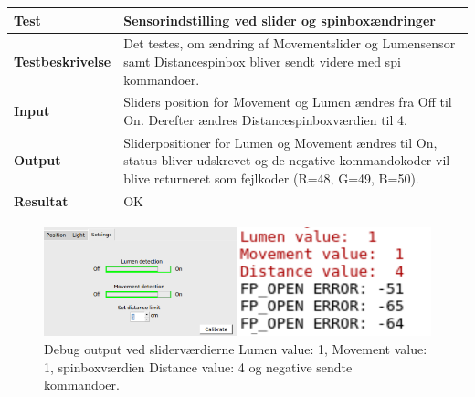 \begin{table}[H]
\begin{tabular}{|l|l|}\hline
\textbf{Test} & Sensorindstilling ved slider og spinboxændringer \\\hline

\textbf{Testbeskrivelse} & \multicolumn{1}{|m{11.5cm}|}{Det testes, om ændring af Movementslider og Lumensensor samt Distancespinbox bliver sendt videre med spi kommandoer.} \\\hline

\textbf{Input} & \multicolumn{1}{|m{11.5cm}|}{Sliders position for Movement og Lumen ændres fra Off til On. Derefter ændres Distancespinboxværdien til 4.} \\\hline

\textbf{Output} & \multicolumn{1}{|m{11.5cm}|}{ Sliderpositioner for Lumen og Movement ændres til On, status bliver udskrevet og de negative kommandokoder vil blive returneret som fejlkoder (R=48, G=49, B=50).} \\\hline

\textbf{Resultat} & \multicolumn{1}{|m{11.5cm}|}{ OK} \\\hline

\end{tabular}
\end{table}

\begin{figure}[H]
\centering
\includegraphics[width=0.9\linewidth]{0_Filer/Figuer/testSettings.png}
\caption{Debug output ved sliderværdierne Lumen value: 1, Movement value: 1, spinboxværdien Distance value: 4 og negative sendte kommandoer.}
\label{fig:testSettings}
\end{figure}



